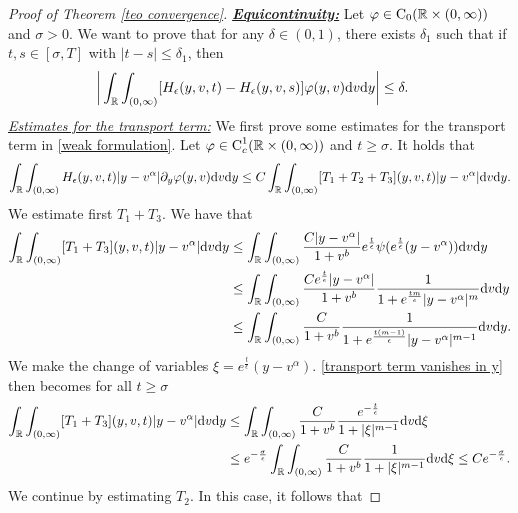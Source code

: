 \documentclass[11pt]{article}
\numberwithin{equation}{section}
\newcommand{\der}{\textup{d}}
\begin{document}
\begin{proof}[Proof of Theorem \ref{teo convergence}]
\underline{\textbf{\textit{Equicontinuity:}}} Let $\varphi\in\textup{C}_{0}(\mathbb{R}\times(0,\infty))$ and $\sigma>0$. We want to prove that for any $\delta\in(0,1)$, there exists $\delta_{1}$ such that if $t,s\in[\sigma,T]$ with $|t-s|\leq \delta_{1}$, then 
\begin{align}\label{equicontinuity}
    \bigg|\int_{\mathbb{R}}\int_{(0,\infty)} & [H_{\epsilon}(y,v,t)-H_{\epsilon}(y,v,s)]\varphi(y,v)\der v \der y\bigg|\leq \delta.
    \end{align}
\underline{\textit{Estimates for the transport term:}} We first prove some estimates for the transport term in \eqref{weak formulation}. Let $\varphi\in\textup{C}^{1}_{c}(\mathbb{R}\times(0,\infty)) $ and $t\geq \sigma$. It holds that
\begin{align}
    \int_{\mathbb{R}}\int_{(0,\infty)}H_{\epsilon}(y,v,t)|y-v^{\alpha}|\partial_{y}\varphi(y,v)\der v \der y\leq  C\int_{\mathbb{R}}\int_{(0,\infty)}[T_{1}+T_{2}+T_{3}](y,v,t)|y-v^{\alpha}|\der v \der y.
\end{align}
We estimate first $T_{1}+T_{3}$. We have that
\begin{align}
    \int_{\mathbb{R}}  \int_{(0,\infty)}[T_{1}+T_{3}](y,v,t)|y-v^{\alpha}|\der v \der y &\leq   \int_{\mathbb{R}}\int_{(0,\infty)}\frac{C|y-v^{\alpha}|}{1+v^{b}}e^{\frac{t}{\epsilon}}\psi(e^{\frac{t}{\epsilon}}(y-v^{\alpha}))\der v \der y\nonumber\\
    &\leq \int_{\mathbb{R}}\int_{(0,\infty)}\frac{Ce^{\frac{t}{\epsilon}}|y-v^{\alpha}|}{1+v^{b}}\frac{1}{1+e^{\frac{tm}{\epsilon}}|y-v^{\alpha}|^{m}}\der v \der y\nonumber\\
     &\leq \int_{\mathbb{R}}\int_{(0,\infty)}\frac{C}{1+v^{b}}\frac{1}{1+e^{\frac{t(m-1)}{\epsilon}}|y-v^{\alpha}|^{m-1}}\der v \der y.\label{transport term vanishes in y}
\end{align}
We make the change of variables $\xi=e^{\frac{t}{\epsilon}}(y-v^{\alpha})$. \eqref{transport term vanishes in y} then becomes for all $t\geq \sigma$
\begin{align*}
    \int_{\mathbb{R}}  \int_{(0,\infty)}[T_{1}+T_{3}](y,v,t)|y-v^{\alpha}|\der v \der y&\leq \int_{\mathbb{R}}\int_{(0,\infty)}\frac{C}{1+v^{b}}\frac{e^{-\frac{t}{\epsilon}}}{1+|\xi|^{m-1}}\der v \der \xi\\
    &\leq e^{-\frac{\sigma}{\epsilon}}\int_{\mathbb{R}}\int_{(0,\infty)}\frac{C}{1+v^{b}}\frac{1}{1+|\xi|^{m-1}}\der v \der \xi\leq C e^{-\frac{\sigma}{\epsilon}}.
\end{align*}
We continue by estimating $T_{2}$. In this case, it follows that

\end{proof}
\end{document}
